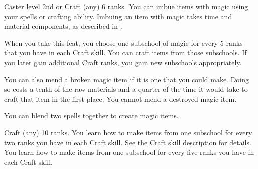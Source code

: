  Caster level 2nd or Craft (any) 6 ranks.
 You can imbue items with magic using your spells or crafting ability. Imbuing an item with magic takes time and material components, as described in .

When you take this feat, you choose one subschool of magic for every 5 ranks that you have in each Craft skill. You can craft items from those subschools. If you later gain additional Craft ranks, you gain new subschools appropriately.

You can also mend a broken magic item if it is one that you could make. Doing so costs a tenth of the raw materials and a quarter of the time it would take to craft that item in the first place. You cannot mend a destroyed magic item.

 You can blend two spells together to create magic items. 

 Craft (any) 10 ranks.
 You learn how to make items from one subschool for every two ranks you have in each Craft skill. See the Craft skill description for details.
 You learn how to make items from one subschool for every five ranks you have in each Craft skill.
